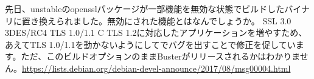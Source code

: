 %

\santaku
{先日、unstableのopensslパッケージが一部機能を無効な状態でビルドしたバイナリに置き換えられました。無効にされた機能とはなんでしょうか。}
{SSL 3.0}
{3DES/RC4}
{TLS 1.0/1.1}
{C}
{TLS 1.2に対応したアプリケーションを増やすため、あえてTLS 1.0/1.1を動かないようにしてでバグを出すことで修正を促しています。ただ、このビルドオプションのままBusterがリリースされるかはわかりません。\url{https://lists.debian.org/debian-devel-announce/2017/08/msg00004.html}}
